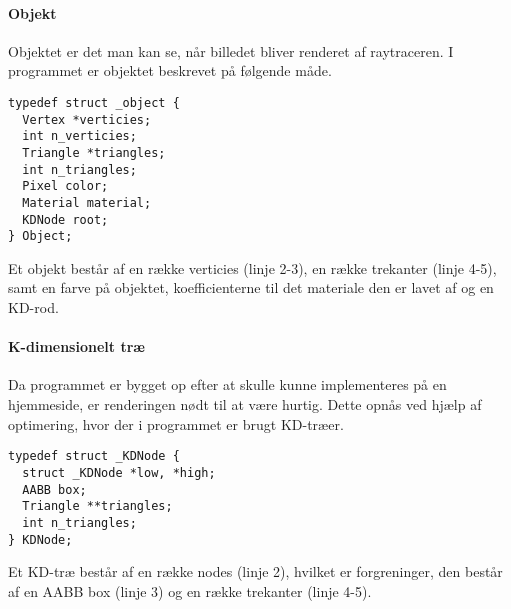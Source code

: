 \paragraph{Objekt}
Objektet er det man kan se, når billedet bliver renderet af raytraceren. I programmet er objektet beskrevet på følgende måde.

\begin{lstlisting}[style=Cstyle, caption=Structs til objektet]
typedef struct _object {
  Vertex *verticies;
  int n_verticies;
  Triangle *triangles;
  int n_triangles;
  Pixel color;
  Material material;
  KDNode root;
} Object;
\end{lstlisting}

Et objekt består af en række verticies (linje 2-3), en række trekanter (linje 4-5), samt en farve på objektet, koefficienterne til det materiale den er lavet af og en KD-rod.

\paragraph{K-dimensionelt træ}
Da programmet er bygget op efter at skulle kunne implementeres på en hjemmeside, er renderingen nødt til at være hurtig. Dette opnås ved hjælp af optimering, hvor der i programmet er brugt KD-træer.

\begin{lstlisting}[style=Cstyle, caption=Struct til KDNode]
typedef struct _KDNode {
  struct _KDNode *low, *high;
  AABB box;
  Triangle **triangles;
  int n_triangles;
} KDNode;
\end{lstlisting}

Et KD-træ består af en række nodes (linje 2), hvilket er forgreninger, den består af en AABB box (linje 3) og en række trekanter (linje 4-5).